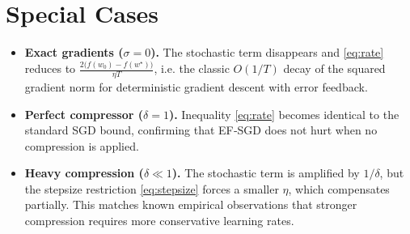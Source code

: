 \documentclass{article}
\begin{document}
\section*{Special Cases}
\begin{itemize}
    \item \textbf{Exact gradients ($\sigma=0$).} The stochastic term disappears and \eqref{eq:rate} reduces to $\frac{2\big(f(w_0)-f(w^\star)\big)}{\eta T}$, i.e. the classic $O(1/T)$ decay of the squared gradient norm for deterministic gradient descent with error feedback.
    \item \textbf{Perfect compressor ($\delta=1$).} Inequality \eqref{eq:rate} becomes identical to the standard SGD bound, confirming that EF‑SGD does not hurt when no compression is applied.
    \item \textbf{Heavy compression ($\delta\ll 1$).} The stochastic term is amplified by $1/\delta$, but the stepsize restriction \eqref{eq:stepsize} forces a smaller $\eta$, which compensates partially. This matches known empirical observations that stronger compression requires more conservative learning rates.
\end{itemize}
\end{document}
